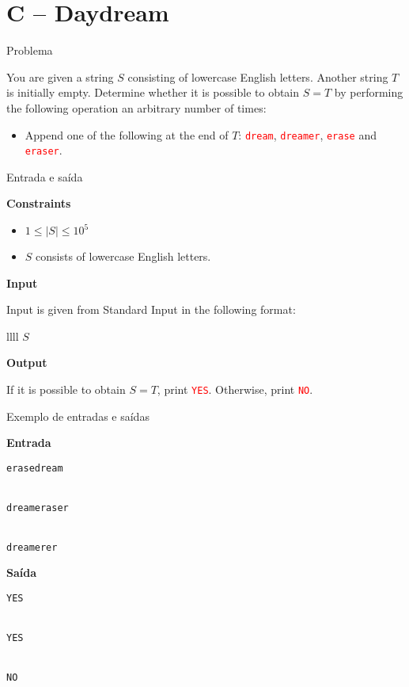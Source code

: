\section{C -- Daydream}

\begin{frame}[fragile]{Problema}

You are given a string $S$ consisting of lowercase English letters. Another string $T$ is
initially empty. Determine whether it is possible to obtain $S = T$ by performing the following 
operation an arbitrary number of times:

\begin{itemize}
    \item Append one of the following at the end of $T$: \texttt{\textcolor{red}{dream}},
        \texttt{\textcolor{red}{dreamer}}, \texttt{\textcolor{red}{erase}} and
        \texttt{\textcolor{red}{eraser}}.
\end{itemize}

\end{frame}

\begin{frame}[fragile]{Entrada e saída}

\textbf{Constraints}

\begin{itemize}
    \item $1\leq |S|\leq 10^5$
    \item $S$ consists of lowercase English letters.
\end{itemize}

\textbf{Input}

Input is given from Standard Input in the following format:
\begin{atcoderio}{llll}
$S$ \\
\end{atcoderio}

\textbf{Output}

If it is possible to obtain $S = T$, print \texttt{\textcolor{red}{YES}}. Otherwise, print
\texttt{\textcolor{red}{NO}}.

\end{frame}

\begin{frame}[fragile]{Exemplo de entradas e saídas}

\begin{minipage}[t]{0.45\textwidth}
\textbf{Entrada}
\begin{verbatim}
erasedream


dreameraser


dreamerer
\end{verbatim}
\end{minipage}
\begin{minipage}[t]{0.5\textwidth}
\textbf{Saída}
\begin{verbatim}
YES


YES


NO
\end{verbatim}
\end{minipage}
\end{frame}

